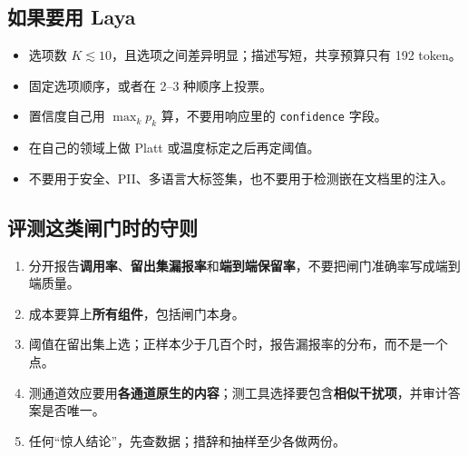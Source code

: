 \documentclass[UTF8,fontset=none,zihao=-4]{ctexart}
\newcommand{\laya}{\textsf{Laya}}
\begin{document}
\subsection{如果要用 \laya{}}
\begin{itemize}
\item 选项数 $K\lesssim10$，且选项之间差异明显；描述写短，共享预算只有 192 token。
\item 固定选项顺序，或者在 2--3 种顺序上投票。
\item 置信度自己用 $\max_k p_k$ 算，不要用响应里的 \texttt{confidence} 字段。
\item 在自己的领域上做 Platt 或温度标定之后再定阈值。
\item 不要用于安全、PII、多语言大标签集，也不要用于检测嵌在文档里的注入。
\end{itemize}

\subsection{评测这类闸门时的守则}
\begin{enumerate}
\item 分开报告\textbf{调用率}、\textbf{留出集漏报率}和\textbf{端到端保留率}，不要把闸门准确率写成端到端质量。
\item 成本要算上\textbf{所有组件}，包括闸门本身。
\item 阈值在留出集上选；正样本少于几百个时，报告漏报率的分布，而不是一个点。
\item 测通道效应要用\textbf{各通道原生的内容}；测工具选择要包含\textbf{相似干扰项}，并审计答案是否唯一。
\item 任何“惊人结论”，先查数据；措辞和抽样至少各做两份。
\end{enumerate}

\end{document}
